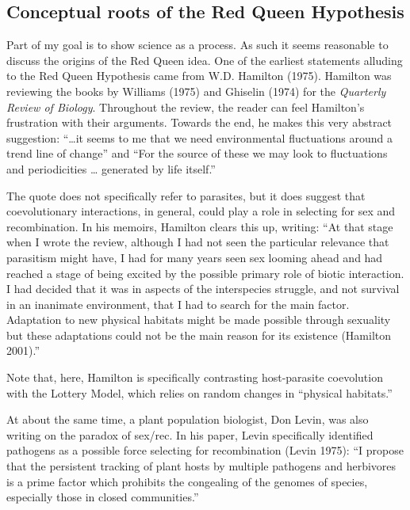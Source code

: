 \documentclass[
  letterpaper,
]{book}
\begin{document}
\hypertarget{conceptual-roots-of-the-red-queen-hypothesis}{%
\subsection{Conceptual roots of the Red Queen
Hypothesis}\label{conceptual-roots-of-the-red-queen-hypothesis}}

Part of my goal is to show science as a process. As such it seems
reasonable to discuss the origins of the Red Queen idea. One of the
earliest statements alluding to the Red Queen Hypothesis came from W.D.
Hamilton (1975). Hamilton was reviewing the books by Williams (1975) and
Ghiselin (1974) for the \emph{Quarterly Review of Biology}. Throughout
the review, the reader can feel Hamilton's frustration with their
arguments. Towards the end, he makes this very abstract suggestion:
``\ldots it seems to me that we need environmental fluctuations around a
trend line of change'' and ``For the source of these we may look to
fluctuations and periodicities \ldots{} generated by life itself.''

The quote does not specifically refer to parasites, but it does suggest
that coevolutionary interactions, in general, could play a role in
selecting for sex and recombination. In his memoirs, Hamilton clears
this up, writing: ``At that stage when I wrote the review, although I
had not seen the particular relevance that parasitism might have, I had
for many years seen sex looming ahead and had reached a stage of being
excited by the possible primary role of biotic interaction. I had
decided that it was in aspects of the interspecies struggle, and not
survival in an inanimate environment, that I had to search for the main
factor. Adaptation to new physical habitats might be made possible
through sexuality but these adaptations could not be the main reason for
its existence (Hamilton 2001).''

Note that, here, Hamilton is specifically contrasting host-parasite
coevolution with the Lottery Model, which relies on random changes in
``physical habitats.''

At about the same time, a plant population biologist, Don Levin, was
also writing on the paradox of sex/rec. In his paper, Levin specifically
identified pathogens as a possible force selecting for recombination
(Levin 1975): ``I propose that the persistent tracking of plant hosts by
multiple pathogens and herbivores is a prime factor which prohibits the
congealing of the genomes of species, especially those in closed
communities.''
\end{document}
